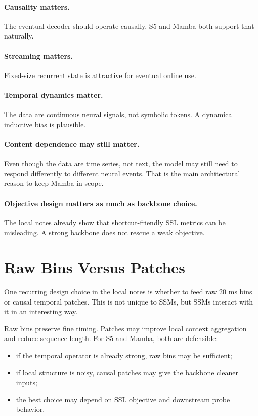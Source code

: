 \paragraph{Causality matters.}
The eventual decoder should operate causally. S5 and Mamba both support that naturally.

\paragraph{Streaming matters.}
Fixed-size recurrent state is attractive for eventual online use.

\paragraph{Temporal dynamics matter.}
The data are continuous neural signals, not symbolic tokens. A dynamical inductive bias is
plausible.

\paragraph{Content dependence may still matter.}
Even though the data are time series, not text, the model may still need to respond
differently to different neural events. That is the main architectural reason to keep
Mamba in scope.

\paragraph{Objective design matters as much as backbone choice.}
The local notes already show that shortcut-friendly SSL metrics can be misleading. A strong
backbone does not rescue a weak objective.

\section{Raw Bins Versus Patches}

One recurring design choice in the local notes is whether to feed raw $20$ ms bins or
causal temporal patches. This is not unique to SSMs, but SSMs interact with it in an
interesting way.

Raw bins preserve fine timing. Patches may improve local context aggregation and reduce
sequence length. For S5 and Mamba, both are defensible:

\begin{itemize}
  \item if the temporal operator is already strong, raw bins may be sufficient;
  \item if local structure is noisy, causal patches may give the backbone cleaner inputs;
  \item the best choice may depend on SSL objective and downstream probe behavior.
\end{itemize}

